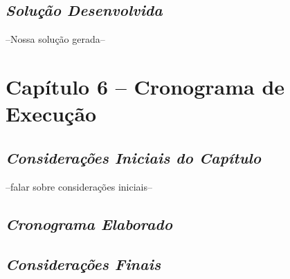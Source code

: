 \section{\textit{Solução Desenvolvida}}
--Nossa solução gerada--

\chapter[Capítulo 6]{Capítulo 6 – Cronograma de Execução}

\section{\textit{Considerações Iniciais do Capítulo}}

--falar sobre considerações iniciais--

\section{\textit{Cronograma Elaborado}}

\section{\textit{Considerações Finais}}